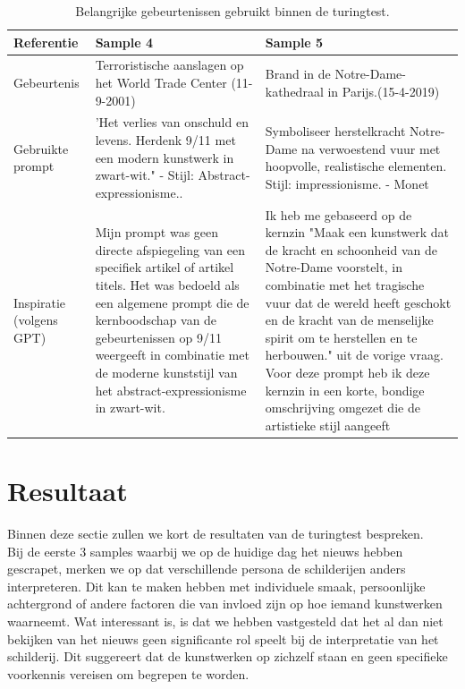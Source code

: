 \begin{table}[htbp]
\begin{tabular}{|p{2.2cm}|p{5.7cm}|p{5.7cm}|}
        \hline
        \textbf{Referentie} &  \textbf{Sample 4} & \textbf{Sample 5} \\
        \hline
        Gebeurtenis &Terroristische aanslagen op het World Trade Center (11-9-2001) &  Brand in de Notre-Dame-kathedraal in Parijs.(15-4-2019) \\
        \hline
        Gebruikte prompt & 'Het verlies van onschuld en levens. Herdenk 9/11 met een modern kunstwerk in zwart-wit." - Stijl: Abstract-expressionisme.. & Symboliseer herstelkracht Notre-Dame na verwoestend vuur met hoopvolle, realistische elementen. Stijl: impressionisme. - Monet \\
        \hline
        Inspiratie (volgens GPT) & Mijn prompt was geen directe afspiegeling van een specifiek artikel of artikel titels. Het was bedoeld als een algemene prompt die de kernboodschap van de gebeurtenissen op 9/11 weergeeft in combinatie met de moderne kunststijl van het abstract-expressionisme in zwart-wit.& Ik heb me gebaseerd op de kernzin "Maak een kunstwerk dat de kracht en schoonheid van de Notre-Dame voorstelt, in combinatie met het tragische vuur dat de wereld heeft geschokt en de kracht van de menselijke spirit om te herstellen en te herbouwen." uit de vorige vraag. Voor deze prompt heb ik deze kernzin in een korte, bondige omschrijving omgezet die de artistieke stijl aangeeft \\
        \hline
    \end{tabular}
    \caption{Belangrijke gebeurtenissen gebruikt binnen de turingtest.}
    \label{table:events_samples}
\end{table}
\pagebreak
\section{Resultaat}
\label{section:result}
Binnen deze sectie zullen we kort de resultaten van de turingtest bespreken. \\

Bij de eerste 3 samples waarbij we op de huidige dag het nieuws hebben gescrapet, merken we op dat verschillende persona de schilderijen anders interpreteren. Dit kan te maken hebben met individuele smaak, persoonlijke achtergrond of andere factoren die van invloed zijn op hoe iemand kunstwerken waarneemt. Wat interessant is, is dat we hebben vastgesteld dat het al dan niet bekijken van het nieuws geen significante rol speelt bij de interpretatie van het schilderij. Dit suggereert dat de kunstwerken op zichzelf staan en geen specifieke voorkennis vereisen om begrepen te worden. \\

